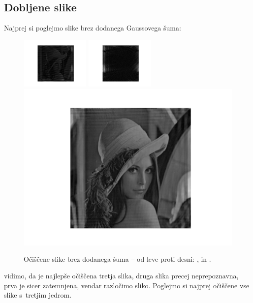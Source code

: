 \documentclass[a4paper,pdftex,10pt]{article}
\numberwithin{figure}{section} %
\begin{document}
\subsection{Dobljene slike}
Najprej si poglejmo slike brez dodanega Gaussovega šuma:
\begin{figure}[H]
    \centering
    \includegraphics[width=0.3\textwidth]{3naloga/ociscena_lena_k1_n0.pdf}
    \includegraphics[width=0.3\textwidth]{3naloga/ociscena_lena_k2_n0.pdf}
    \includegraphics[width=0.3textwidth]{3naloga/ociscena_lena_k3_n0.pdf}
    \caption{Očiščene slike brez dodanega šuma -- od leve proti desni: 
    \protect{}, \protect{} in \protect{}.}
    \label{slika10}
\end{figure}
vidimo, da je najlepše očiščena tretja slika, druga slika precej neprepoznavna, prva je 
sicer zatemnjena, vendar razločimo sliko. Poglejmo si najprej očiščene vse slike s~tretjim
jedrom.
\end{document}
